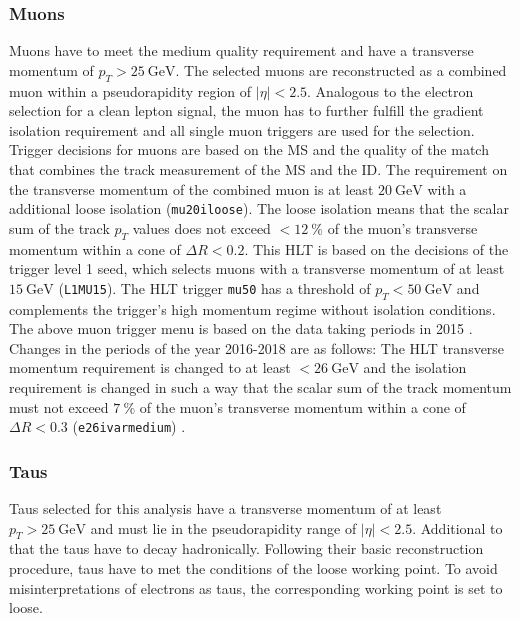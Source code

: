 \subsubsection*{Muons}
Muons have to meet the medium quality requirement and have a transverse momentum of $p_T>\SI{25}{\giga\electronvolt}$. The selected muons are reconstructed as a combined muon within a pseudorapidity region of $|\eta|<2.5$. Analogous to the electron selection for a clean lepton signal, the muon has to further fulfill the gradient isolation requirement and all single muon triggers are used for the selection.\newline
Trigger decisions for muons are based on the MS and the quality of the match that combines the track measurement of the MS and the ID. The requirement on the transverse momentum of the combined muon is at least $\SI{20}{\giga\electronvolt}$ with a additional loose isolation (\texttt{mu20\textunderscore iloose}). The loose isolation means that the scalar sum of the track $p_T$ values does not exceed $<\SI{12}{\percent}$ of the muon's transverse momentum within a cone of $\Delta R<0.2$. This HLT is based on the decisions of the trigger level 1 seed, which selects muons with a transverse momentum of at least $\SI{15}{\giga\electronvolt}$ (\texttt{L1MU15}). The HLT trigger \texttt{mu50} has a threshold of $p_T<\SI{50}{\giga\electronvolt}$ and complements the trigger's high momentum regime without isolation conditions. The above muon trigger menu is based on the data taking periods in 2015 \cite{trigger:e:mu}. Changes in the periods of the year 2016-2018 are as follows: \newline
The HLT transverse momentum requirement is changed to at least $<\SI{26}{\giga\electronvolt}$ and the isolation requirement is changed in such a way that the scalar sum of the track momentum must not exceed $\SI{7}{\percent}$ of the muon's transverse momentum within a cone of $\Delta R<0.3$ (\texttt{e26\textunderscore ivarmedium}) \cite{trigger:mu}.            
%
%
\subsubsection*{Taus}
Taus selected for this analysis have a transverse momentum of at least $p_T>\SI{25}{\giga\electronvolt}$ and must lie in the pseudorapidity range of $|\eta|<2.5$. Additional to that the taus have to decay hadronically. Following their basic reconstruction procedure, taus have to met the conditions of the loose working point. To avoid misinterpretations of electrons as taus, the corresponding working point is set to loose.
